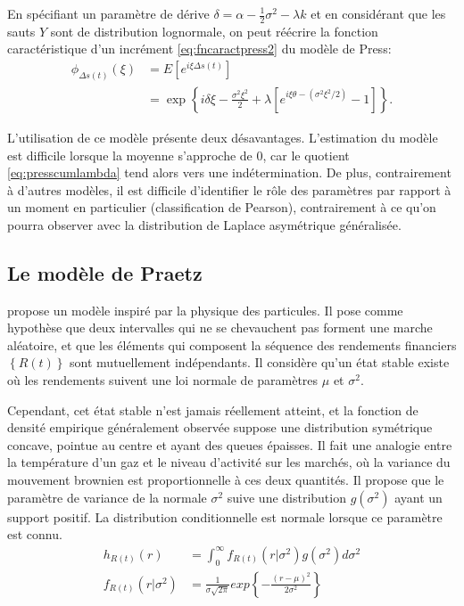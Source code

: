 En spécifiant un paramètre de dérive $\delta =
\alpha-\frac{1}{2}\sigma^2-\lambda k$ et en considérant que les
sauts $Y$ sont de distribution lognormale, on peut réécrire la
fonction caractéristique d'un incrément \eqref{eq:fncaractpress2} du
modèle de Press:
\begin{align}
  \label{eq:fncaractmerton}
  \phi_{\Delta s(t)}\left(\xi\right) &= E\left[e^{i\xi\Delta s(t)} \right] \nonumber \\
  &= \exp\left\{i\delta \xi -\frac{\sigma^2 \xi^2}{2} + \lambda
    \left[e^{i \xi\theta -(\sigma^2 \xi^2/2)}-1 \right] \right\}.
\end{align}

L'utilisation de ce modèle présente deux désavantages. L'estimation du
modèle est difficile lorsque la moyenne s'approche de 0, car le
quotient \eqref{eq:presscumlambda} tend alors vers une
indétermination. De plus, contrairement à d'autres modèles, il est
difficile d'identifier le rôle des paramètres par rapport à un moment
en particulier (classification de Pearson), contrairement à ce qu'on
pourra observer avec la distribution de Laplace asymétrique
généralisée.

\subsection{Le modèle de Praetz}

\cite{praetz1972distribution} propose un modèle inspiré par la
physique des particules. Il pose comme hypothèse que deux intervalles
qui ne se chevauchent pas forment une marche aléatoire, et que les
éléments qui composent la séquence des rendements financiers $\left\{
  R(t) \right\}$ sont mutuellement indépendants. Il considère qu'un
état stable existe où les rendements suivent une loi normale de
paramètres $\mu$ et $\sigma^2$.

Cependant, cet état stable n'est jamais réellement atteint, et la
fonction de densité empirique généralement observée suppose une
distribution symétrique concave, pointue au centre et ayant des queues
épaisses. Il fait une analogie entre la température d'un gaz et le
niveau d'activité sur les marchés, où la variance du mouvement
brownien est proportionnelle à ces deux quantités. Il propose que le
paramètre de variance de la normale $\sigma^2$ suive une distribution
$g(\sigma^2)$ ayant un support positif. La distribution conditionnelle
est normale lorsque ce paramètre est connu.
\begin{align}
  h_{R(t)}(r) &= \int_0^{\infty} f_{R(t)}(r|\sigma^2) g(\sigma^2) d\sigma^2 \\
  f_{R(t)}(r|\sigma^2) &= \frac{1}{\sigma\sqrt{2\pi}}exp\left\{-\frac{(r-\mu)^2}{2\sigma^2} \right\} \label{eq:praetz72}
\end{align}

